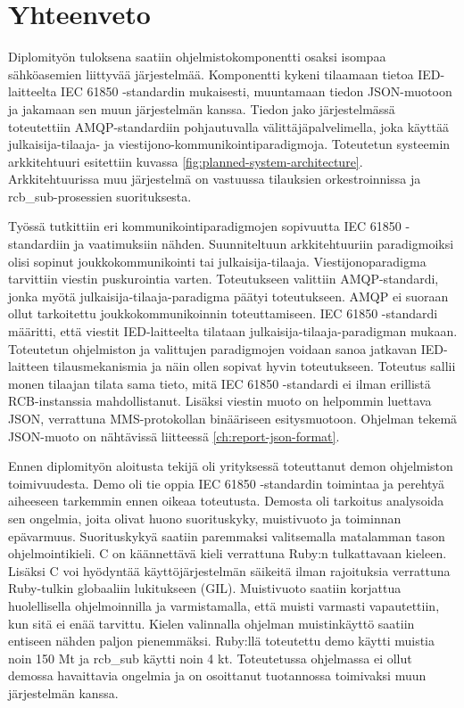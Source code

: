 \chapter{Yhteenveto}
\label{ch:yhteenveto}
Diplomityön tuloksena saatiin ohjelmistokomponentti osaksi isompaa sähköasemien liittyvää järjestelmää. Komponentti kykeni tilaamaan tietoa IED-laitteelta IEC 61850 -stan\-dar\-din mukaisesti, muuntamaan tiedon JSON-muotoon ja jakamaan sen muun järjestelmän kanssa. Tiedon jako järjestelmässä toteutettiin AMQP-standardiin pohjautuvalla välittäjäpalvelimella, joka käyttää julkaisija-tilaaja- ja viestijono-kom\-mu\-ni\-koin\-ti\-pa\-ra\-dig\-mo\-ja. Toteutetun systeemin arkkitehtuuri esitettiin kuvassa \ref{fig:planned-system-architecture}. Arkkitehtuurissa muu järjestelmä on vastuussa tilauksien orkestroinnissa ja rcb\_sub-prosessien suorituksesta.

Työssä tutkittiin eri kommunikointiparadigmojen sopivuutta IEC 61850 -standardiin ja vaatimuksiin nähden. Suunniteltuun arkkitehtuuriin paradigmoiksi olisi sopinut joukkokommunikointi tai julkaisija-tilaaja. Viestijonoparadigma tarvittiin viestin puskurointia varten. Toteutukseen valittiin AMQP-standardi, jonka myötä julkaisija-tilaaja-paradigma päätyi toteutukseen. AMQP ei suoraan ollut tarkoitettu joukkokommunikoinnin toteuttamiseen. IEC 61850 -standardi määritti, että viestit IED-laitteelta tilataan julkaisija-tilaaja-paradigman mukaan. Toteutetun ohjelmiston ja valittujen paradigmojen voidaan sanoa jatkavan IED-laitteen tilausmekanismia ja näin ollen sopivat hyvin toteutukseen. Toteutus sallii monen tilaajan tilata sama tieto, mitä IEC 61850 -standardi ei ilman erillistä RCB-instanssia mahdollistanut. Lisäksi viestin muoto on helpommin luettava JSON, verrattuna MMS-protokollan binääriseen esitysmuotoon. Ohjelman tekemä JSON-muoto on nähtävissä liitteessä \ref{ch:report-json-format}.

Ennen diplomityön aloitusta tekijä oli yrityksessä toteuttanut demon ohjelmiston toimivuudesta. Demo oli tie oppia IEC 61850 -standardin toimintaa ja perehtyä aiheeseen tarkemmin ennen oikeaa toteutusta. Demosta oli tarkoitus analysoida sen ongelmia, joita olivat huono suorituskyky, muistivuoto ja toiminnan epävarmuus. Suorituskykyä saatiin paremmaksi valitsemalla matalamman tason ohjelmointikieli. C on käännettävä kieli verrattuna Ruby:n tulkattavaan kieleen. Lisäksi C voi hyödyntää käyttöjärjestelmän säikeitä ilman rajoituksia verrattuna Ruby-tulkin globaaliin lukitukseen (GIL). Muistivuoto saatiin korjattua huolellisella ohjelmoinnilla ja varmistamalla, että muisti varmasti vapautettiin, kun sitä ei enää tarvittu. Kielen valinnalla ohjelman muistinkäyttö saatiin entiseen nähden paljon pienemmäksi. Ruby:llä toteutettu demo käytti muistia noin 150 Mt ja rcb\_sub käytti noin 4 kt. Toteutetussa ohjelmassa ei ollut demossa havaittavia ongelmia ja on osoittanut tuotannossa toimivaksi muun järjestelmän kanssa.

